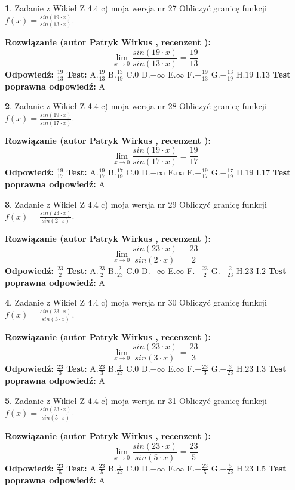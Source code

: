 \documentclass[12pt, a4paper]{article}
\theoremstyle{definition} %
\newtheorem{zad}{}
\newcommand{\zadStart}[1]{\begin{zad}#1\newline}
\newcommand{\zadStop}{\end{zad}}
\newcommand{\rozwStart}[2]{\noindent \textbf{Rozwiązanie (autor #1 , recenzent #2): }\newline}
\newcommand{\rozwStop}{\newline}
\newcommand{\odpStart}{\noindent \textbf{Odpowiedź:}\newline}
\newcommand{\odpStop}{\newline}
\newcommand{\testStart}{\noindent \textbf{Test:}\newline}
\newcommand{\testStop}{\newline}
\newcommand{\kluczStart}{\noindent \textbf{Test poprawna odpowiedź:}\newline}
\newcommand{\kluczStop}{\newline}
\begin{document}
\zadStart{Zadanie z Wikieł Z 4.4 c) moja wersja nr 27}
Obliczyć granicę funkcji $f(x)=\frac{sin(19\cdot x)}{sin(13\cdot x)}$.
\zadStop
\rozwStart{Patryk Wirkus}{}
$$\lim\limits_{x\to 0}\frac{sin(19\cdot x)}{sin(13\cdot x)}=
\frac{19}{13}$$
\rozwStop
\odpStart
$\frac{19}{13}$
\odpStop
\testStart
A.$\frac{19}{13}$
B.$\frac{13}{19}$
C.$0$
D.$-\infty$
E.$\infty$
F.$-\frac{19}{13}$
G.$-\frac{13}{19}$
H.$19$
I.$13$
\testStop
\kluczStart
A
\kluczStop



\zadStart{Zadanie z Wikieł Z 4.4 c) moja wersja nr 28}
Obliczyć granicę funkcji $f(x)=\frac{sin(19\cdot x)}{sin(17\cdot x)}$.
\zadStop
\rozwStart{Patryk Wirkus}{}
$$\lim\limits_{x\to 0}\frac{sin(19\cdot x)}{sin(17\cdot x)}=
\frac{19}{17}$$
\rozwStop
\odpStart
$\frac{19}{17}$
\odpStop
\testStart
A.$\frac{19}{17}$
B.$\frac{17}{19}$
C.$0$
D.$-\infty$
E.$\infty$
F.$-\frac{19}{17}$
G.$-\frac{17}{19}$
H.$19$
I.$17$
\testStop
\kluczStart
A
\kluczStop



\zadStart{Zadanie z Wikieł Z 4.4 c) moja wersja nr 29}
Obliczyć granicę funkcji $f(x)=\frac{sin(23\cdot x)}{sin(2\cdot x)}$.
\zadStop
\rozwStart{Patryk Wirkus}{}
$$\lim\limits_{x\to 0}\frac{sin(23\cdot x)}{sin(2\cdot x)}=
\frac{23}{2}$$
\rozwStop
\odpStart
$\frac{23}{2}$
\odpStop
\testStart
A.$\frac{23}{2}$
B.$\frac{2}{23}$
C.$0$
D.$-\infty$
E.$\infty$
F.$-\frac{23}{2}$
G.$-\frac{2}{23}$
H.$23$
I.$2$
\testStop
\kluczStart
A
\kluczStop



\zadStart{Zadanie z Wikieł Z 4.4 c) moja wersja nr 30}
Obliczyć granicę funkcji $f(x)=\frac{sin(23\cdot x)}{sin(3\cdot x)}$.
\zadStop
\rozwStart{Patryk Wirkus}{}
$$\lim\limits_{x\to 0}\frac{sin(23\cdot x)}{sin(3\cdot x)}=
\frac{23}{3}$$
\rozwStop
\odpStart
$\frac{23}{3}$
\odpStop
\testStart
A.$\frac{23}{3}$
B.$\frac{3}{23}$
C.$0$
D.$-\infty$
E.$\infty$
F.$-\frac{23}{3}$
G.$-\frac{3}{23}$
H.$23$
I.$3$
\testStop
\kluczStart
A
\kluczStop



\zadStart{Zadanie z Wikieł Z 4.4 c) moja wersja nr 31}
Obliczyć granicę funkcji $f(x)=\frac{sin(23\cdot x)}{sin(5\cdot x)}$.
\zadStop
\rozwStart{Patryk Wirkus}{}
$$\lim\limits_{x\to 0}\frac{sin(23\cdot x)}{sin(5\cdot x)}=
\frac{23}{5}$$
\rozwStop
\odpStart
$\frac{23}{5}$
\odpStop
\testStart
A.$\frac{23}{5}$
B.$\frac{5}{23}$
C.$0$
D.$-\infty$
E.$\infty$
F.$-\frac{23}{5}$
G.$-\frac{5}{23}$
H.$23$
I.$5$
\testStop
\kluczStart
A
\kluczStop
\end{document}
